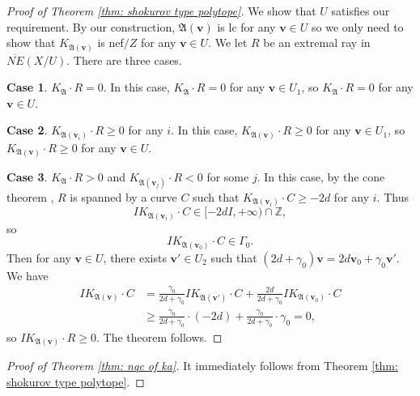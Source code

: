 \documentclass[12pt]{amsart}
\numberwithin{equation}{section}
\newcommand{\Aa}{{\mathfrak{A}}}
\newcommand{\Ii}{\Gamma}
\theoremstyle{definition}
\theoremstyle{definition}
\theoremstyle{definition}
\begin{document}
\begin{proof}[Proof of Theorem \ref{thm: shokurov type polytope}]
    We show that $U$ satisfies our requirement. By our construction, $\Aa(\bm{v})$ is lc for any $\bm{v}\in U$ so we only need to show that $K_{\Aa(\bm{v})}$ is nef$/Z$ for any $\bm{v}\in U$. We let $R$ be an extremal ray in $\overline{NE}(X/U)$. There are three cases.

    \medskip

    \noindent\textbf{Case 1}. $K_{\Aa}\cdot R=0$. In this case, $K_{\Aa}\cdot R=0$ for any $\bm{v}\in U_1$, so $K_{\Aa}\cdot R=0$ for any $\bm{v}\in U$.

\medskip

    \noindent\textbf{Case 2}. $K_{\Aa(\bm{v}_i)}\cdot R\geq 0$ for any $i$. In this case, $K_{\Aa(\bm{v})}\cdot R\geq 0$ for any $\bm{v}\in U_1$, so $K_{\Aa(\bm{v})}\cdot R\geq 0$ for any $\bm{v}\in U$.

    \medskip

     \noindent\textbf{Case 3}. $K_{\Aa}\cdot R>0$ and $K_{\Aa(\bm{v}_j)}\cdot R<0$ for some $j$. In this case, by the cone theorem \cite[Theorem 1.3]{CHLMSSX24}, $R$ is spanned by a curve $C$ such that $K_{\Aa(\bm{v}_i)}\cdot C\geq -2d$ for any $i$. Thus $$IK_{\Aa(\bm{v}_i)}\cdot C\in [-2dI,+\infty)\cap\mathbb Z,$$
    so
    $$IK_{\Aa(\bm{v}_0)}\cdot C\in\Ii_0.$$
    Then for any $\bm{v}\in U$, there exists $\bm{v}'\in U_2$ such that $(2d+\gamma_0)\bm{v}=2d\bm{v}_0+\gamma_0\bm{v}'$. We have
    \begin{align*}
        IK_{\Aa(\bm{v})}\cdot C&=\frac{\gamma_0}{2d+\gamma_0}IK_{\Aa(\bm{v}')}\cdot C+\frac{2d}{2d+\gamma_0}IK_{\Aa(\bm{v}_0)}\cdot C\\
        &\geq \frac{\gamma_0}{2d+\gamma_0}\cdot (-2d)+\frac{\gamma_0}{2d+\gamma_0}\cdot\gamma_0=0,
    \end{align*}
    so $IK_{\Aa(\bm{v})}\cdot R\geq 0$. The theorem follows.
\end{proof}

\begin{proof}[Proof of Theorem \ref{thm: nqc of ka}]
    It immediately follows from Theorem \ref{thm: shokurov type polytope}.
\end{proof}
\end{document}
